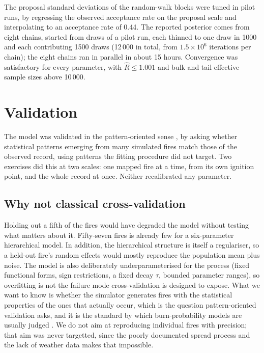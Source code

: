 \documentclass[11pt,a4paper]{article}
\begin{document}
The proposal standard deviations of the random-walk blocks were tuned in pilot runs, by
regressing the observed acceptance rate on the proposal scale and interpolating to an
acceptance rate of 0.44. The reported posterior comes from eight chains, started from
draws of a pilot run, each thinned to one draw in 1000 and each contributing 1500 draws
(12\,000 in total, from $1.5 \times 10^6$ iterations per chain); the eight chains ran in
parallel in about 15 hours. Convergence was satisfactory for every parameter, with
$\hat{R} \le 1.001$ and bulk and tail effective sample sizes above 10\,000.

\section{Validation}
\label{sec:validation}

The model was validated in the pattern-oriented sense
\citep{grimm2005pattern, hartig2011statistical}, by asking whether statistical patterns
emerging from many simulated fires match those of the observed record, using patterns the
fitting procedure did not target. Two exercises did this at two scales: one mapped fire at
a time, from its own ignition point, and the whole record at once. Neither recalibrated any
parameter.

\subsection{Why not classical cross-validation}

Holding out a fifth of the fires would have degraded the model without testing
what matters about it. Fifty-seven fires is already few for a six-parameter
hierarchical model. In addition, the hierarchical structure is itself a regulariser,
so a held-out fire's random effects would mostly reproduce the population mean
plus noise. The model is also deliberately underparameterised for the process
(fixed functional forms, sign restrictions, a fixed decay $\tau$, bounded
parameter ranges), so overfitting is not the failure mode cross-validation is
designed to expose. What we want to know is whether the simulator generates fires
with the statistical properties of the ones that actually occur, which is the
question pattern-oriented validation asks, and it is the standard by which
burn-probability models are usually judged \citep{parisien2020commentary}. 
We do not aim at reproducing individual fires with precision; that aim was 
never targetted, since the poorly documented spread process and the lack of 
weather data makes that impossible.
\end{document}
